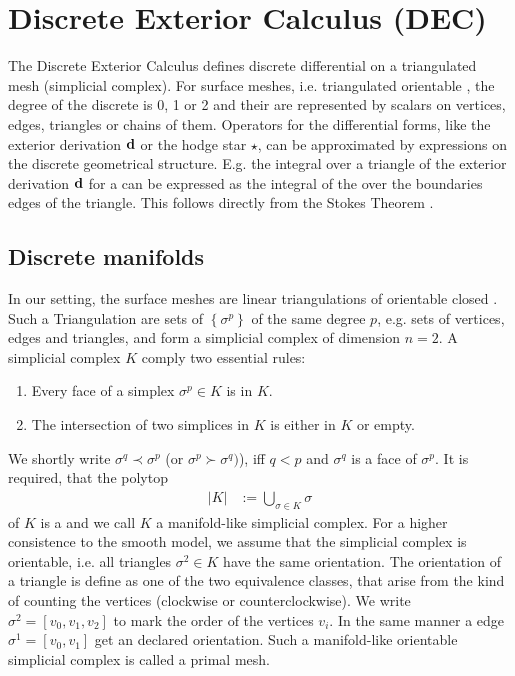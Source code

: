 \section{Discrete Exterior Calculus (DEC)}
  The Discrete Exterior Calculus \citep{hirani, desbrun} defines discrete differential  on a triangulated mesh (simplicial complex).
  For surface meshes, i.e. triangulated orientable , the degree of the discrete  is 0, 1 or 2
  and their are represented by scalars on vertices, edges, triangles or chains of them. 
  Operators for the differential forms, like the exterior derivation \( \mathbf{d} \) or the hodge star \( \star \), can be approximated by expressions on the discrete
  geometrical structure. 
  E.g. the integral over a triangle of the exterior derivation \( \mathbf{d} \) for a  can be expressed as the integral of the
   over the boundaries edges of the triangle. 
  This follows directly from the Stokes Theorem \citep[Ch. 7]{marsden}. 
 
  \subsection{Discrete manifolds}
    In our setting, the surface meshes are linear triangulations of orientable closed .
    Such a Triangulation are sets of  \( \left\{ \sigma^{p} \right\} \) of the same degree \( p \), e.g. sets of vertices,
    edges and triangles, and form a simplicial complex of dimension \( n=2 \).
    A simplicial complex \( K \) comply two essential rules:
    \begin{enumerate}
      \item Every face of a simplex \( \sigma^{p}\in K \) is in \( K \).
      \item The intersection of two simplices in \( K \) is either in \( K \) or empty.
    \end{enumerate}
    We shortly write \( \sigma^{q}\prec\sigma^{p} \) (or \( \sigma^{p}\succ\sigma^{q}) \)), 
    iff \( q<p \) and \( \sigma^{q} \) is a face of \( \sigma^{p} \). 
    It is required, that the polytop
    \begin{align}
      |K| &:= \bigcup_{\sigma\in K} \sigma 
    \end{align}
    of \( K \) is a  and we call \( K \) a manifold-like simplicial complex.
    For a higher consistence to the smooth model, we assume that the simplicial complex is orientable,
    i.e. all triangles \( \sigma^{2}\in K \) have the same orientation.
    The orientation of a triangle is define as one of the two equivalence classes, that arise from the kind of counting the vertices
    (clockwise or counterclockwise).
    We write \( \sigma^{2}=\left[ v_{0}, v_{1}, v_{2} \right] \) to mark the order of the vertices \( v_{i} \).
    In the same manner a edge \( \sigma^{1} = \left[ v_{0}, v_{1} \right] \) get an declared orientation.
    Such a manifold-like orientable simplicial complex is called a primal mesh.


